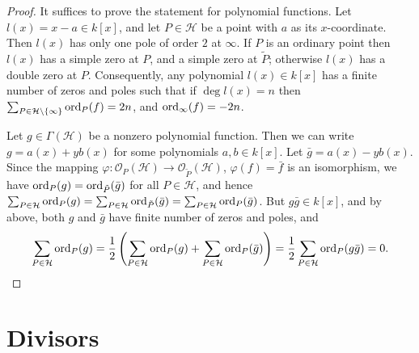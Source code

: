 \begin{proof}
It suffices to prove the statement for polynomial functions. Let $l(x) = x - a \in k[x]$, and let $P 
\in \mathcal{H}$ be a point with $a$ as its $x$-coordinate. Then $l(x)$ has only one pole of order 
$2$ at $\infty$. If $P$ is an ordinary point then $l(x)$ has a simple zero at $P$, and a simple zero 
at $\tilde{P}$; otherwise $l(x)$ has a double zero at $P$. Consequently, any polynomial $l(x) \in 
k[x]$ has a finite number of zeros and poles such that if $\deg l(x) = n$ then $\sum_{P \in 
\mathcal{H}\backslash \{\infty\}} \operatorname{ord}_P(f) = 2n$, and $\operatorname{ord}_\infty(f) = -2n$. 

Let $g \in \Gamma(\mathcal{H})$ be a nonzero polynomial function. Then we can write $g = a(x) + 
yb(x)$ for some polynomials $a, b \in k[x]$. Let $\bar{g} = a(x) - yb(x)$. Since the mapping 
$\varphi: \mathcal{O}_P(\mathcal{H}) \rightarrow \mathcal{O}_{\tilde{P}}(\mathcal{H})$, $\varphi(f) 
= \bar{f}$ is an isomorphism, we have $\operatorname{ord}_P(g) = \operatorname{ord}_{\tilde{P}}(\bar{g})$ for all $P \in 
\mathcal{H}$, and hence $\sum_{P \in \mathcal{H}} \operatorname{ord}_P(g) = \sum_{P \in \mathcal{H}} 
\operatorname{ord}_{\tilde{P}}(\bar{g}) = \sum_{P \in \mathcal{H}} \operatorname{ord}_P(\bar{g})$. But $g\bar{g} \in k[x]$, 
and by above, both $g$ and $\bar{g}$ have finite number of zeros and poles, and
\[
\sum_{P \in \mathcal{H}} \operatorname{ord}_P(g) = \frac{1}{2}\left( \sum_{P \in \mathcal{H}} \operatorname{ord}_P(g) + 
\sum_{P \in \mathcal{H}} \operatorname{ord}_P(\bar{g}) \right) = \frac{1}{2}\sum_{P \in \mathcal{H}} 
\operatorname{ord}_P(g\bar{g}) = 0. \qedhere
\]
\end{proof}










\section{Divisors}

